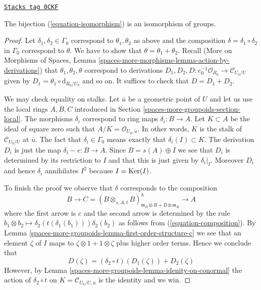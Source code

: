 \begin{lemma}
\label{spaces-more-groupoids-lemma-composition-is-addition}
\href{https://stacks.math.columbia.edu/tag/0CKF}{\texttt{Stacks tag 0CKF}}

The bijection (\ref{equation-isomorphism}) is an isomorphism
of groups.
\end{lemma}

\begin{proof}
Let $\delta_1, \delta_2 \in \Gamma_0$ correspond to $\theta_1, \theta_2$
as above and the composition $\delta = \delta_1 \circ \delta_2$
in $\Gamma_0$ correspond to $\theta$. We have to show that
$\theta = \theta_1 + \theta_2$. Recall
(More on Morphisms of Spaces, Lemma
\ref{spaces-more-morphisms-lemma-action-by-derivations})
that $\theta_1, \theta_2, \theta$ correspond to derivations
$D_1, D_2, D : e_0^{-1}\mathcal{O}_{R_0} \to \mathcal{C}_{U_0/U}$
given by $D_1 = \theta_1 \circ \text{d}_{R_0/U_0}$ and so on.
It suffices to check that $D = D_1 + D_2$.

\medskip\noindent
We may check equality on stalks.
Let $\overline{u}$ be a geometric point of $U$ and let us use the local
rings $A, B, C$ introduced in Section \ref{spaces-more-groupoids-section-local}.
The morphisms $\delta_i$ correspond to ring
maps $\delta_i : B \to A$. Let $K \subset A$ be the ideal of
square zero such that $A/K = \mathcal{O}_{U_0, \overline{u}}$.
In other words, $K$ is the stalk of $\mathcal{C}_{U_0/U}$ at $\overline{u}$.
The fact that $\delta_i \in \Gamma_0$
means exactly that $\delta_i(I) \subset K$.
The derivation $D_i$ is just the map $\delta_i - e : B \to A$.
Since $B = s(A) \oplus I$ we see that $D_i$ is determined by
its restriction to $I$ and that this is just given by
$\delta_i|_I$. Moreover $D_i$ and hence $\delta_i$ annihilates $I^2$
because $I = \operatorname{Ker}(I)$.

\medskip\noindent
To finish the proof we observe that $\delta$ corresponds to the
composition
$$
B \to C =
(B \otimes_{s, A, t} B)^h_{\mathfrak m_B \otimes B + B \otimes \mathfrak m_B}
\to A
$$
where the first arrow is $c$ and the second arrow is determined
by the rule
$b_1 \otimes b_2 \mapsto \delta_2(t(\delta_1(b_1))) \delta_2(b_2)$
as follows from (\ref{equation-composition}).
By Lemma \ref{spaces-more-groupoids-lemma-first-order-structure-c}
we see that an element $\zeta$ of $I$ maps to
$\zeta \otimes 1 + 1 \otimes \zeta$ plus higher order terms.
Hence we conclude that
$$
D(\zeta) = (\delta_2 \circ t)\left(D_1(\zeta)\right) + D_2(\zeta)
$$
However, by Lemma \ref{spaces-more-groupoids-lemma-idenity-on-conormal}
the action of $\delta_2 \circ t$ on
$K = \mathcal{C}_{U_0/U, \overline{u}}$ is the identity and
we win.
\end{proof}

